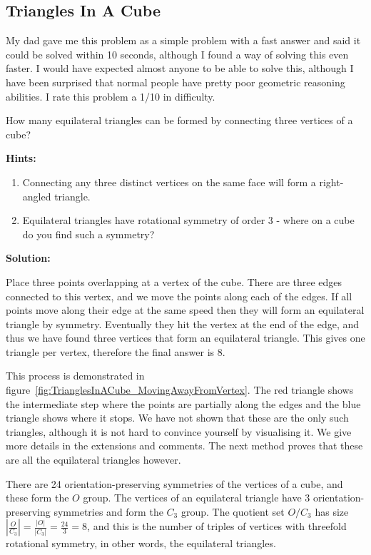 \subsection{Triangles In A Cube}

My dad gave me this problem as a simple problem with a fast answer and said it could be solved within 10 seconds, although I found a way of solving this even faster. I would have expected almost anyone to be able to solve this, although I have been surprised that normal people have pretty poor geometric reasoning abilities. I rate this problem a 1/10 in difficulty.

How many equilateral triangles can be formed by connecting three vertices of a cube?

\textbf{Hints:}

\begin{enumerate}
	\item Connecting any three distinct vertices on the same face will form a right-angled triangle.
	\item Equilateral triangles have rotational symmetry of order 3 - where on a cube do you find such a symmetry?
\end{enumerate}

\textbf{Solution:}

Place three points overlapping at a vertex of the cube. There are three edges connected to this vertex, and we move the points along each of the edges. If all points move along their edge at the same speed then they will form an equilateral triangle by symmetry. Eventually they hit the vertex at the end of the edge, and thus we have found three vertices that form an equilateral triangle. This gives one triangle per vertex, therefore the final answer is 8.

This process is demonstrated in figure~\ref{fig:TrianglesInACube_MovingAwayFromVertex}. The red triangle shows the intermediate step where the points are partially along the edges and the blue triangle shows where it stops. We have not shown that these are the only such triangles, although it is not hard to convince yourself by visualising it. We give more details in the extensions and comments. The next method proves that these are all the equilateral triangles however.

There are 24 orientation-preserving symmetries of the vertices of a cube, and these form the $O$ group. The vertices of an equilateral triangle have 3 orientation-preserving symmetries and form the $C_3$ group. The quotient set $O/C_3$ has size $\left| \frac{O}{C_3} \right| = \frac{|O|}{|C_3|} = \frac{24}{3} = 8$, and this is the number of triples of vertices with threefold rotational symmetry, in other words, the equilateral triangles.

